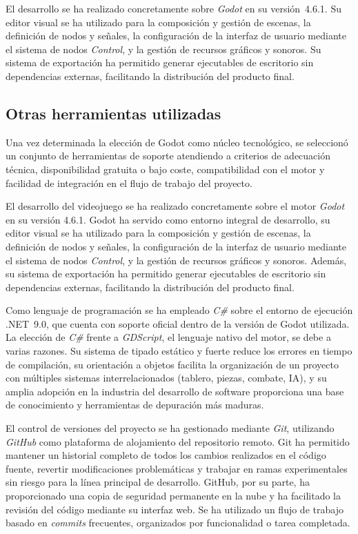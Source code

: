 El desarrollo se ha realizado concretamente sobre \textit{Godot} en su versión~4.6.1. Su editor visual se ha utilizado para la composición y gestión de escenas, la definición de nodos y señales, la configuración de la interfaz de usuario mediante el sistema de nodos \textit{Control}, y la gestión de recursos gráficos y sonoros. Su sistema de exportación ha permitido generar ejecutables de escritorio sin dependencias externas, facilitando la distribución del producto final.

\subsection{Otras herramientas utilizadas}

Una vez determinada la elección de Godot como núcleo tecnológico, se seleccionó un conjunto de herramientas de soporte atendiendo a criterios de adecuación técnica, disponibilidad gratuita o bajo coste, compatibilidad con el motor y facilidad de integración en el flujo de trabajo del proyecto. 

El desarrollo del videojuego se ha realizado concretamente sobre el motor \textit{Godot} en su versión 4.6.1. Godot ha servido como entorno integral de desarrollo, su editor visual se ha utilizado para la composición y gestión de escenas, la definición de nodos y señales, la configuración de la interfaz de usuario mediante el sistema de nodos \textit{Control}, y la gestión de recursos gráficos y sonoros. Además, su sistema de exportación ha permitido generar ejecutables de escritorio sin dependencias externas, facilitando la distribución del producto final.

\clearpage

Como lenguaje de programación se ha empleado \textit{C\#} sobre el entorno de ejecución .NET~9.0, que cuenta con soporte oficial dentro de la versión de Godot utilizada. La elección de \textit{C\#} frente a \textit{GDScript}, el lenguaje nativo del motor, se debe a varias razones. Su sistema de tipado estático y fuerte reduce los errores en tiempo de compilación, su orientación a objetos facilita la organización de un proyecto con múltiples sistemas interrelacionados (tablero, piezas, combate, IA), y su amplia adopción en la industria del desarrollo de software proporciona una base de conocimiento y herramientas de depuración más maduras.

El control de versiones del proyecto se ha gestionado mediante \textit{Git}, utilizando \textit{GitHub} como plataforma de alojamiento del repositorio remoto. Git ha permitido mantener un historial completo de todos los cambios realizados en el código fuente, revertir modificaciones problemáticas y trabajar en ramas experimentales sin riesgo para la línea principal de desarrollo. GitHub, por su parte, ha proporcionado una copia de seguridad permanente en la nube y ha facilitado la revisión del código mediante su interfaz web. Se ha utilizado un flujo de trabajo basado en \textit{commits} frecuentes, organizados por funcionalidad o tarea completada.

